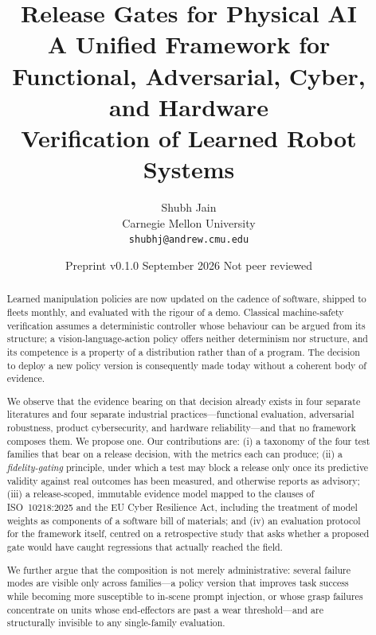 \documentclass[11pt]{article}
\title{\vspace{-2.2em}\textbf{Release Gates for Physical AI}\\[0.35em]
\large A Unified Framework for Functional, Adversarial, Cyber, and Hardware\\
Verification of Learned Robot Systems}
\author{Shubh Jain\\ \small Carnegie Mellon University \\ \small\texttt{shubhj@andrew.cmu.edu}}
\date{\small Preprint v0.1.0 \quad\textbullet\quad 30 September 2026 \quad\textbullet\quad Not peer reviewed}
\theoremstyle{definition}
\newcommand{\term}[1]{\emph{#1}}
\begin{document}
\maketitle

\begin{center}
\end{center}

\begin{abstract}
\noindent Learned manipulation policies are now updated on the cadence of software, shipped
to fleets monthly, and evaluated with the rigour of a demo. Classical machine-safety
verification assumes a deterministic controller whose behaviour can be argued from its
structure; a vision-language-action policy offers neither determinism nor structure, and its
competence is a property of a distribution rather than of a program. The decision to deploy
a new policy version is consequently made today without a coherent body of evidence.

We observe that the evidence bearing on that decision already exists in four separate
literatures and four separate industrial practices---functional evaluation, adversarial
robustness, product cybersecurity, and hardware reliability---and that no framework
composes them. We propose one. Our contributions are: (i) a taxonomy of the four test
families that bear on a release decision, with the metrics each can produce; (ii) a
\term{fidelity-gating} principle, under which a test may block a release only once its
predictive validity against real outcomes has been measured, and otherwise reports as
advisory; (iii) a release-scoped, immutable evidence model mapped to the clauses of
ISO~10218:2025 and the EU Cyber Resilience Act, including the treatment of model weights as
components of a software bill of materials; and (iv) an evaluation protocol for the
framework itself, centred on a retrospective study that asks whether a proposed gate would
have caught regressions that actually reached the field.

We further argue that the composition is not merely administrative: several failure modes
are visible only across families---a policy version that improves task success while
becoming more susceptible to in-scene prompt injection, or whose grasp failures concentrate
on units whose end-effectors are past a wear threshold---and are structurally invisible to
any single-family evaluation.
\end{abstract}
\end{document}
